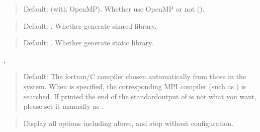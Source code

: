 \documentclass[letterpaper,10pt,pdftex,openany,english]{sphinxmanual}
\begin{document}
\sphinxAtStartPar
{}
\begin{quote}

\sphinxAtStartPar
Default:  (with OpenMP).
Whether use OpenMP or not ().
\end{quote}

\sphinxAtStartPar
{}
\begin{quote}

\sphinxAtStartPar
Default: .
Whether generate shared library.
\end{quote}

\sphinxAtStartPar
{}
\begin{quote}

\sphinxAtStartPar
Default: .
Whether generate static library.
\end{quote}

\sphinxAtStartPar
{}, 
\begin{quote}

\sphinxAtStartPar
Default: The fortran/C compiler chosen automatically from those in the system.
When  is specified, the corresponding MPI compiler
(such as ) is searched.
If  printed the end of the standard\sphinxhyphen{}output of  is not
what you want, please set it manually as .
\end{quote}

\sphinxAtStartPar
{}
\begin{quote}

\sphinxAtStartPar
Display all options including above, and stop without configuration.
\end{quote}

\sphinxstepscope
\end{document}
